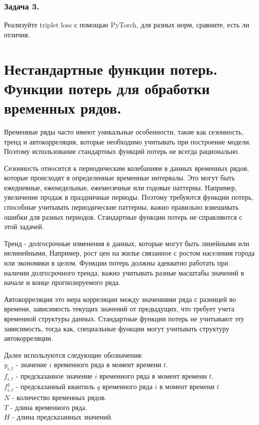 \subsubsection*{Задача 3.}

Реализуйте triplet loss с помощью PyTorch, для разных норм, сравните, есть ли отличия.


\newpage

\section*{Нестандартные функции потерь. Функции потерь для обработки временных рядов.}

Временные ряды часто имеют уникальные особенности, такие как сезонность, тренд и автокорреляция, которые необходимо учитывать при построение модели. Поэтому использование стандартных функций потерь не всегда рационально.

Сезонность относится к периодическим колебаниям в данных временных рядов, которые происходят в определенные временные интервалы. Это могут быть ежедневные, еженедельные, ежемесячные или годовые паттерны. Например, увеличение продаж в праздничные периоды.
Поэтому требуются функции потерь, способные учитывать периодические паттерны, важно правильно взвешивать ошибки для разных периодов. Стандартные функции потерь не справляются с этой задачей.

Тренд - долгосрочные изменения в данных, которые могут быть линейными или нелинейными,
Например, рост цен на жилье связанное с ростом населения города или экономики в целом.
Функции потерь должны адекватно работать при наличии долгосрочного тренда, важно учитывать разные масштабы значений в начале и конце прогнозируемого ряда.

Автокорреляция это мера корреляции между значениями ряда с разницей во времени, зависимость текущих значений от предыдущих, что требует учета временной структуры данных.
Стандартные функции потерь не учитывают эту зависимость, тогда как, специальные функции могут учитывать структуру автокорреляции.

Далее используются следующие обозначения:\\
$y_{i,t}$ - значение $i$ временного ряда в момент времени $t$.\\
$f_{i,t}$ - предсказанное значение $i$ временного ряда в момент времени $t$.\\
$f_{i,t}^q$ - предсказанный квантиль $q$ временного ряда $i$ в момент времени $t$\\
$N$ - количество временных рядов.\\
$T$ -  длина временного ряда.\\
$H$ - длина предсказанных значений.\\

